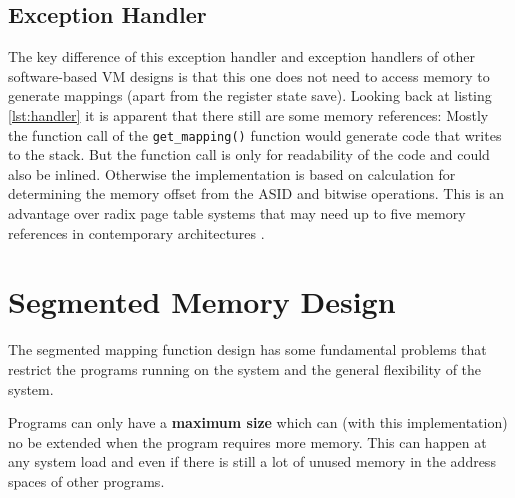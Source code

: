 \subsection{Exception Handler} The key difference of this exception handler and exception handlers
of other software-based VM designs is that this one does not need to access
memory to generate mappings (apart from the register state save).
Looking back at listing \ref{lst:handler} it is apparent that there still are some
memory references:
Mostly the function call of the \texttt{get\_mapping()} function would generate code that
writes to the stack. But the function call is only for readability of the code and could also
be inlined.
Otherwise the implementation is based on calculation for determining the memory offset from
the ASID and bitwise operations.
This is an advantage over radix page table systems that may need up to five memory references
in contemporary architectures \cite{intel5LevelPaging5Level2017}.

\section{Segmented Memory Design}
The segmented mapping function design has some fundamental problems that restrict the programs running on the system and the general flexibility of the system.

Programs can only have a \textbf{maximum size} which can (with this implementation) no be extended when the program requires more memory. This can happen at any system load and even if there is still a lot of unused memory in the address spaces of other programs.

